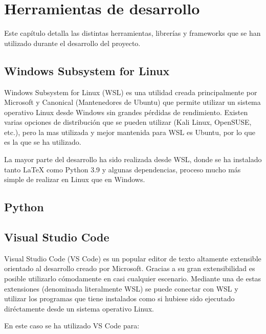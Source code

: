 \label{cha:Técnicas y herraminetas}

\section{Herramientas de desarrollo}

Este capítulo detalla las distintas herramientas, librerías y frameworks que se
han utilizado durante el desarrollo del proyecto.

\subsection{Windows Subsystem for Linux}

Windows Subsystem for Linux (WSL) es una utilidad creada principalmente por
Microsoft y Canonical (Mantenedores de Ubuntu) que permite utilizar un sistema
operativo Linux desde Windows sin grandes pérdidas de rendimiento. Existen
varias opciones de distribución que se pueden utilizar (Kali Linux, OpenSUSE,
etc.), pero la mas utilizada y mejor mantenida para WSL es Ubuntu, por lo que es
la que se ha utilizado.

La mayor parte del desarrollo ha sido realizada desde WSL, donde se ha instalado
tanto \LaTeX{} como Python 3.9 y algunas dependencias, proceso mucho más simple
de realizar en Linux que en Windows.

\subsection{Python}


\subsection{Visual Studio Code}

Visual Studio Code (VS Code) es un popular editor de texto altamente extensible
orientado al desarrollo creado por Microsoft. Gracias a su gran extensibilidad
es posible utilizarlo cómodamente en casi cualquier escenario. Mediante una de
estas extensiones (denominada literalmente WSL) se puede conectar con WSL y
utilizar los programas que tiene instalados como si hubiese sido ejecutado
diréctamente desde un sistema operativo Linux.

En este caso se ha utilizado VS Code para:

